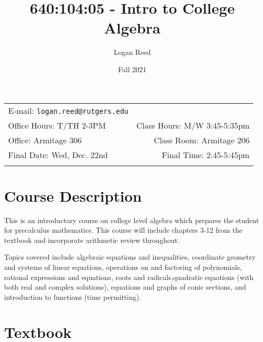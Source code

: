 \documentclass[11pt]{article}
\title{640:104:05 - Intro to College Algebra}
\author{Logan Reed}
\date{Fall 2021}
\newcommand{\blankline}{\quad\pagebreak[2]}
\begin{document}
\maketitle

\blankline

\begin{tabular*}{.93\textwidth}{@{\extracolsep{\fill}}lr}


E-mail: \texttt{logan.reed@rutgers.edu} 
\\

 Office Hours: T/TH 2-3PM  &  Class Hours: M/W 3:45-5:35pm \\

 Office: Armitage 306 & Class Room: Armitage 206 \\
 
Final Date: Wed, Dec. 22nd  & Final Time: 2:45-5:45pm \\
&  \\
\hline
\end{tabular*}

\vspace{5 mm}


\section*{Course Description}

This is an introductory course on college level algebra which prepares
the student for precalculus mathematics. This course will include
chapters 3-12 from the textbook and incorporate arithmetic review
throughout.

\bigskip

\noindent Topics covered include algebraic equations and
inequalities, coordinate geometry and systems of linear equations,
operations on and factoring of polynomials, rational expressions and
equations, roots and radicals,quadratic equations (with both real and
complex solutions), equations and graphs of conic sections, and
introduction to functions (time permitting).


\section*{Textbook}
\end{document}
